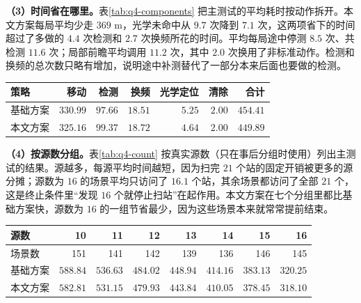 \textbf{（3）时间省在哪里。}表\ref{tab:q4-components} 把主测试的平均耗时按动作拆开。本文方案每局平均少走 $369$ m，光学未命中从 $9.7$ 次降到 $7.1$ 次，这两项省下的时间超过了多做的 $4.4$ 次检测和 $2.7$ 次换频所花的时间。平均每局途中停测 $8.5$ 次、共检测 $11.6$ 次；局部前瞻平均调用 $11.2$ 次，其中 $2.0$ 次换用了非标准动作。检测和换频的总次数只略有增加，说明途中补测替代了一部分本来后面也要做的检测。

\Needspace{36mm}
\begin{center}
\begin{minipage}{\linewidth}
\centering\small
{}
\label{tab:q4-components}
\vspace{4pt}
\begin{tabular}{@{}lrrrrrr@{}}
\toprule
策略 & 移动 & 检测 & 换频 & 光学定位 & 清除 & 合计 \\
\midrule
基础方案 & $330.99$ & $97.66$ & $18.51$ & $5.25$ & $2.00$ & $454.41$ \\
本文方案 & $325.16$ & $99.37$ & $18.72$ & $4.64$ & $2.00$ & $449.89$ \\
\bottomrule
\end{tabular}
\end{minipage}
\end{center}

\textbf{（4）按源数分组。}表\ref{tab:q4-count} 按真实源数（只在事后分组时使用）列出主测试的结果。源越多，每源平均时间越短，因为扫完 $21$ 个站的固定开销被更多的源分摊；源数为 $16$ 的场景平均只访问了 $16.1$ 个站，其余场景都访问了全部 $21$ 个，这是终止条件里“发现 $16$ 个就停止扫站”在起作用。本文方案在七个分组里都比基础方案快，源数为 $16$ 的一组节省最少，因为这些场景本来就常常提前结束。

\Needspace{40mm}
\begin{center}
\begin{minipage}{\linewidth}
\centering\small
{}
\label{tab:q4-count}
\vspace{4pt}
\begin{tabular}{@{}lrrrrrrr@{}}
\toprule
源数 & 10 & 11 & 12 & 13 & 14 & 15 & 16 \\
\midrule
场景数 & 151 & 141 & 142 & 139 & 136 & 146 & 145 \\
基础方案 & $588.84$ & $536.63$ & $484.02$ & $448.94$ & $414.16$ & $383.13$ & $320.25$ \\
本文方案 & $582.81$ & $531.15$ & $479.93$ & $443.84$ & $410.05$ & $378.45$ & $318.10$ \\
\bottomrule
\end{tabular}
\end{minipage}
\end{center}

